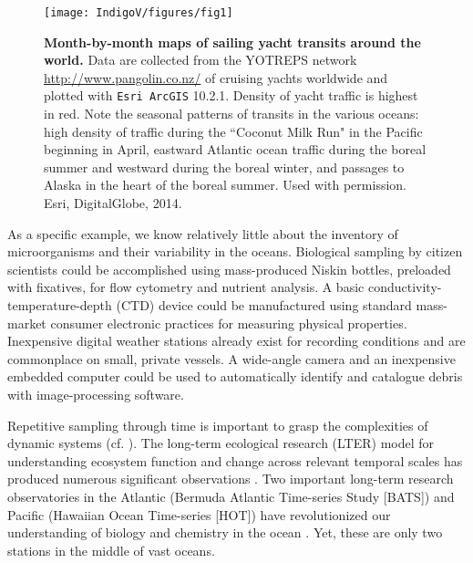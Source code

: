 \begin{figure}
\centering
\texttt{[image: IndigoV/figures/fig1]}
\caption{\textbf{Month-by-month maps of sailing yacht transits around the world.} Data are collected from the YOTREPS network \url{http://www.pangolin.co.nz/} of cruising yachts worldwide and plotted with {\tt Esri ArcGIS} 10.2.1. Density of yacht traffic is highest in red. Note the seasonal patterns of transits in the various oceans: high density of traffic during the ``Coconut Milk Run" in the Pacific beginning in April, eastward Atlantic ocean traffic during the boreal summer and westward during the boreal winter, and passages to Alaska in the heart of the boreal summer. Used with permission. Esri, DigitalGlobe, 2014.}
\label{IV_fig1}
\end{figure}

As a specific example, we know relatively little about the inventory of microorganisms and their variability in the oceans. Biological sampling by citizen scientists could be accomplished using mass-produced Niskin bottles, preloaded with fixatives, for flow cytometry and nutrient analysis. A basic conductivity-temperature-depth (CTD) device could be manufactured using standard mass-market consumer electronic practices for measuring physical properties. Inexpensive digital weather stations already exist for recording conditions and are commonplace on small, private vessels. A wide-angle camera and an inexpensive embedded computer could be used to automatically identify and catalogue debris with image-processing software.

Repetitive sampling through time is important to grasp the complexities of dynamic systems (cf. \cite{hobbs_long-term_2007, walther_ecological_2002, wootton_dynamic_2008}). The long-term ecological research (LTER) model for understanding ecosystem function and change across relevant temporal scales has produced numerous significant observations \cite{ainsworth_what_2005, montes-hugo_recent_2009}. Two important long-term research observatories in the Atlantic (Bermuda Atlantic Time-series Study [BATS]) and Pacific (Hawaiian Ocean Time-series [HOT]) have revolutionized our understanding of biology and chemistry in the ocean \cite{siegal_interpretations_2001}. Yet, these are only two stations in the middle of vast oceans.

